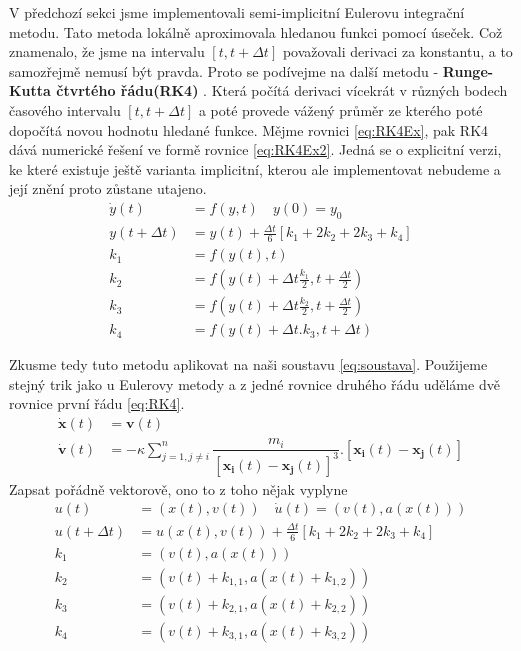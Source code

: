 V předchozí sekci jsme implementovali semi-implicitní Eulerovu integrační metodu. Tato metoda lokálně aproximovala hledanou funkci pomocí úseček. Což znamenalo, že jsme na intervalu $ \left[ t,t+\Delta t\right]  $ považovali derivaci za konstantu, a to samozřejmě nemusí být pravda. Proto se podívejme na další metodu -  \textbf{Runge-Kutta čtvrtého řádu(RK4)} . Která počítá derivaci vícekrát v různých bodech časového intervalu $ \left[ t,t+\Delta t\right]  $ a poté provede vážený průměr ze kterého poté dopočítá novou hodnotu hledané funkce. Mějme rovnici \eqref{eq:RK4Ex}, pak RK4 dává numerické řešení ve formě rovnice \eqref{eq:RK4Ex2}. Jedná se o explicitní verzi, ke které existuje ještě varianta implicitní, kterou ale implementovat nebudeme a její znění proto zůstane utajeno.
\begin{align}
\label{eq:RK4Ex}
\dot y (t) &= f(y,t) \quad y(0)=y_0\\
\label{eq:RK4Ex2}
y(t + \Delta t) &= y(t) + \frac{\Delta t}{6}\left[ k_1 + 2k_2 + 2k_3 + k_4\right] \\
k_1 &= f(y(t),t)\nonumber\\
k_2 &= f(y(t) + \Delta t\frac{k_1}{2}, t+\frac{\Delta t}{2})\nonumber \\
k_3 &= f(y(t) + \Delta t\frac{k_2}{2}, t+\frac{\Delta t}{2})\nonumber \\
k_4 &= f(y(t) + \Delta t. k_3, t+\Delta t)\nonumber
\end{align}

Zkusme tedy tuto metodu aplikovat na naši soustavu \eqref{eq:soustava}. Použijeme stejný trik jako u Eulerovy metody a z jedné rovnice druhého řádu uděláme dvě rovnice první řádu \eqref{eq:RK4}.
\begin{subequations}
	\label{eq:RK4}
	\begin{align}
	\label{eq:RK4pos}
	\dot{\boldsymbol{x}}(t)&=\boldsymbol{v}(t)\\
	\label{eq:RK4vel}
	\dot{\boldsymbol{v}}(t)&=-  \kappa \sum_{j=1,j \neq i}^{n}\dfrac{m_i}
	{\left[ \boldsymbol{x_i}(t) - \boldsymbol{x_j}(t)\right] ^3} . 
	\left[ \boldsymbol{x_i}(t) - \boldsymbol{x_j}(t)\right] 
	\end{align}
\end{subequations}
Zapsat pořádně vektorově, ono to z toho nějak vyplyne
\begin{align}
u(t) &= (x(t),v(t)) \quad \dot{u}(t)=(v(t),a(x(t)))\\
u(t+\Delta t) &= u(x(t),v(t)) + \frac{\Delta t}{6}\left[ k_1 + 2k_2 + 2k_3 + k_4\right] \\
k_1 &= (v(t),a(x(t)))\nonumber\\
k_2 &= (v(t) +k_{1,1},a(x(t) + k_{1,2}))\nonumber\\
k_3 &= (v(t) +k_{2,1},a(x(t) + k_{2,2}))\nonumber\\
k_4 &= (v(t) +k_{3,1},a(x(t) + k_{3,2}))\nonumber
\end{align}

